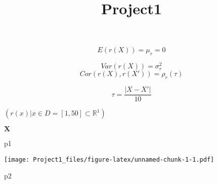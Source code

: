 \documentclass[]{article}
\title{Project1}
\author{}
\date{}
\newenvironment{Shaded}{\begin{snugshade}}{\end{snugshade}}
\newcommand{\NormalTok}[1]{#1}
\begin{document}
\maketitle

\newcommand{\vect}[1]{\boldsymbol{\mathbf{#1}}}
\newcommand{\matr}[1]{\boldsymbol{\mathbf{#1}}}
\newcommand{\det}{det}
\newcommand{\exp}{exp}
\newcommand{\exp}{iid}

\[E(r(X)) = \mu_r = 0\]

\[Var(r(X)) = \sigma_r^2\] \[ Cor(r(X), r(X')) = \rho_r(\tau) \]

\[\tau = \frac{| X - X'|}{10}\]

\((r(x) | x\in D = [1, 50]\subset \mathbb{R}^1)\)

\(\vect{X}\)

\begin{Shaded}
\begin{Highlighting}[]
\NormalTok{p1}
\end{Highlighting}
\end{Shaded}

\texttt{[image: Project1\_files/figure-latex/unnamed-chunk-1-1.pdf]}

\begin{Shaded}
\begin{Highlighting}[]
\NormalTok{p2}
\end{Highlighting}
\end{Shaded}
\end{document}
